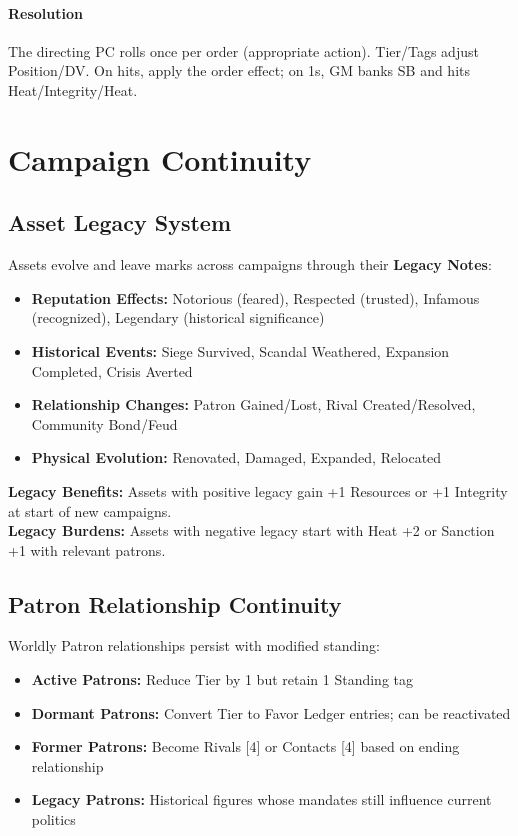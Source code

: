 \documentclass[10pt]{article}
\begin{document}
\begin{center}
    \paragraph{Resolution} The directing PC rolls once per order (appropriate action). Tier/Tags adjust Position/DV. On hits, apply the order effect; on 1s, GM banks SB and hits Heat/Integrity/Heat.
    
    \section{Campaign Continuity}
    \subsection{Asset Legacy System}
    Assets evolve and leave marks across campaigns through their \textbf{Legacy Notes}:
    \begin{itemize}
      \item \textbf{Reputation Effects:} Notorious (feared), Respected (trusted), Infamous (recognized), Legendary (historical significance)
      \item \textbf{Historical Events:} Siege Survived, Scandal Weathered, Expansion Completed, Crisis Averted
      \item \textbf{Relationship Changes:} Patron Gained/Lost, Rival Created/Resolved, Community Bond/Feud
      \item \textbf{Physical Evolution:} Renovated, Damaged, Expanded, Relocated
    \end{itemize}
    
    \textbf{Legacy Benefits:} Assets with positive legacy gain +1 Resources or +1 Integrity at start of new campaigns.\\
    \textbf{Legacy Burdens:} Assets with negative legacy start with Heat +2 or Sanction +1 with relevant patrons.
    
    \subsection{Patron Relationship Continuity}
    Worldly Patron relationships persist with modified standing:
    \begin{itemize}
      \item \textbf{Active Patrons:} Reduce Tier by 1 but retain 1 Standing tag
      \item \textbf{Dormant Patrons:} Convert Tier to Favor Ledger entries; can be reactivated
      \item \textbf{Former Patrons:} Become Rivals [4] or Contacts [4] based on ending relationship
      \item \textbf{Legacy Patrons:} Historical figures whose mandates still influence current politics
    \end{itemize}
    

\end{center}
\end{document}
